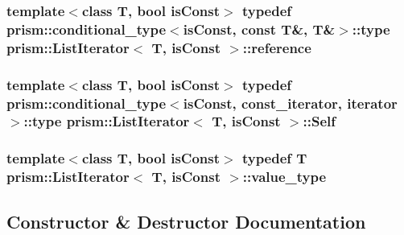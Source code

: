 \subsubsection[{\texorpdfstring{reference}{reference}}]{\setlength{\rightskip}{0pt plus 5cm}template$<$class T, bool is\+Const$>$ typedef {\bf prism\+::conditional\+\_\+type}$<$is\+Const, const T\&, T\&$>$\+::type {\bf prism\+::\+List\+Iterator}$<$ T, is\+Const $>$\+::{\bf reference}}\hypertarget{structprism_1_1_list_iterator_a8a07c86e6d1ef38b0f7d390ad7c05c22}{}\label{structprism_1_1_list_iterator_a8a07c86e6d1ef38b0f7d390ad7c05c22}
\subsubsection[{\texorpdfstring{Self}{Self}}]{\setlength{\rightskip}{0pt plus 5cm}template$<$class T, bool is\+Const$>$ typedef {\bf prism\+::conditional\+\_\+type}$<$is\+Const, {\bf const\+\_\+iterator}, {\bf iterator}$>$\+::type {\bf prism\+::\+List\+Iterator}$<$ T, is\+Const $>$\+::{\bf Self}}\hypertarget{structprism_1_1_list_iterator_a54dfed5d1937a612aa2ae524b55f8087}{}\label{structprism_1_1_list_iterator_a54dfed5d1937a612aa2ae524b55f8087}
\subsubsection[{\texorpdfstring{value\+\_\+type}{value_type}}]{\setlength{\rightskip}{0pt plus 5cm}template$<$class T, bool is\+Const$>$ typedef T {\bf prism\+::\+List\+Iterator}$<$ T, is\+Const $>$\+::{\bf value\+\_\+type}}\hypertarget{structprism_1_1_list_iterator_a8b0844caeee92f469961951784b675fa}{}\label{structprism_1_1_list_iterator_a8b0844caeee92f469961951784b675fa}


\subsection{Constructor \& Destructor Documentation}
